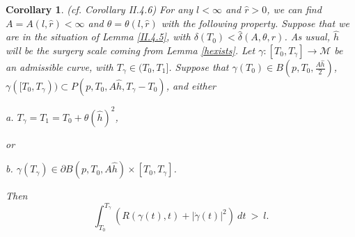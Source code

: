 \documentclass[12pt]{amsart}
\newcommand{\D}{\partial}
\newcommand{\M}{{\mathcal M}}
\renewcommand{\th}{\theta}
\newcommand{\ga}{\gamma}
\newcommand{\ra}{\rightarrow}
\numberwithin{equation}{section}
\theoremstyle{plain}
\newtheorem{corollary}[equation]{Corollary}
\theoremstyle{definition}
\theoremstyle{remark}
\begin{document}
\begin{corollary} (cf. Corollary II.4.6)
\label{corollaryII.4.6}
For any $l<\infty$ and $\hat r>0$, we can find $A=A(l,\hat r)<\infty$ and
$\th=\th(l,\hat r)$ with the following property.
Suppose that we are in the situation of Lemma \ref{II.4.5}, with
$\delta(T_0) < \hat{\delta}(A, \th, \hat r)$.
As usual,
$\hat h$ will be the surgery scale coming from Lemma \ref{hexists}.
Let $\ga:[T_0,T_\ga]\ra \M$
be an admissible curve, with
$T_\ga\in (T_0,T_1]$.
Suppose that
$\ga(T_0)\in B(p,T_0,\frac{A\hat h}{2})$,
$\ga([T_0,T_\ga))\subset P(p,T_0,A\hat h, T_\ga-T_0)$, and
either 

a. $T_\ga=T_1=T_0+\th(\hat h)^2$,

or

b. $\ga(T_\ga)\in\D B(p,T_0,A\hat h)\times [T_0,T_\ga]$.

Then 
\begin{equation}
\int_{T_0}^{T_\ga} \left( R(\gamma(t),t)+|\dot{\ga}(t)|^2 \right) \: dt
\: > \: l.
\end{equation}
\end{corollary}
\end{document}
